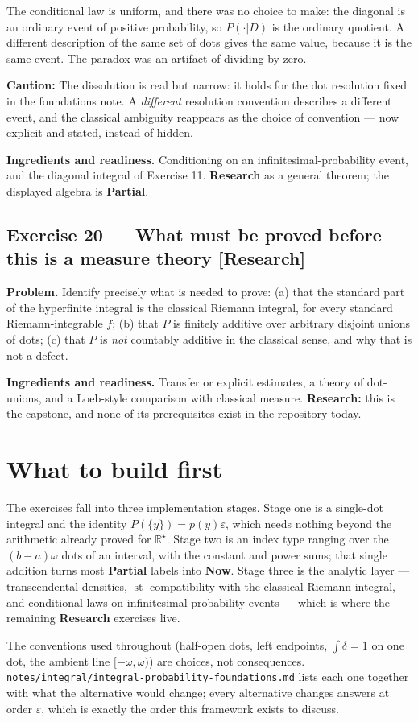 \documentclass[11pt]{article}
\newcommand{\Rstar}{\mathbb{R}^{\star}}
\newcommand{\eps}{\varepsilon}
\newcommand{\st}{\operatorname{st}}
\begin{document}
The conditional law is uniform, and there was no choice to make: the diagonal
is an ordinary event of positive probability, so $P(·|D)$ is the ordinary
quotient. A different description of the same set of dots gives the same
value, because it is the same event. The paradox was an artifact of dividing
by zero.

\textbf{Caution:} The dissolution is real but narrow: it holds for the dot resolution fixed
in the foundations note. A \emph{different} resolution convention describes a
different event, and the classical ambiguity reappears as the choice of
convention --- now explicit and stated, instead of hidden.

\textbf{Ingredients and readiness.} Conditioning on an infinitesimal-probability
event, and the diagonal integral of Exercise 11. \textbf{Research} as a general
theorem; the displayed algebra is \textbf{Partial}.


\subsection*{Exercise 20 --- What must be proved before this is a measure theory \hfill \normalfont\small[Research]}

\textbf{Problem.} Identify precisely what is needed to prove: (a) that the standard
part of the hyperfinite integral is the classical Riemann integral, for every
standard Riemann-integrable $f$; (b) that $P$ is finitely additive over arbitrary disjoint unions of dots;
(c) that $P$ is \emph{not} countably additive in the classical sense, and why that
is not a defect.

\textbf{Ingredients and readiness.} Transfer or explicit estimates, a theory of
dot-unions, and a Loeb-style comparison with classical measure.
\textbf{Research:} this is the capstone, and none of its prerequisites exist in the
repository today.


\section*{What to build first}

The exercises fall into three implementation stages. Stage one is a
single-dot integral and the identity $P(\{y\})=p(y)\eps$, which needs nothing
beyond the arithmetic already proved for $\Rstar$. Stage two is an index type
ranging over the $(b-a)\omega$ dots of an interval, with the constant and
power sums; that single addition turns most \textbf{Partial} labels into
\textbf{Now}. Stage three is the analytic layer --- transcendental densities,
$\st$-compatibility with the classical Riemann integral, and conditional laws
on infinitesimal-probability events --- which is where the remaining
\textbf{Research} exercises live.

The conventions used throughout (half-open dots, left endpoints,
$\int\delta = 1$ on one dot, the ambient line $[-\omega,\omega)$) are choices,
not consequences. \texttt{notes/integral/integral-probability-foundations.md}
lists each one together with what the alternative would change; every
alternative changes answers at order $\eps$, which is exactly the order this
framework exists to discuss.
\end{document}
